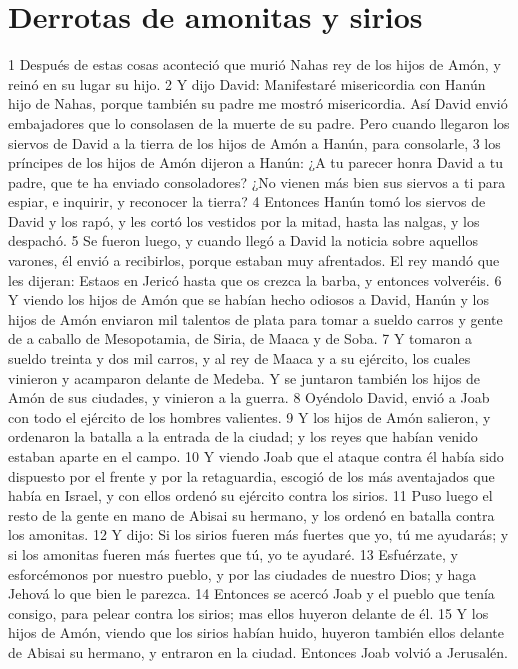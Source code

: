 \section*{Derrotas de amonitas y sirios}

1 Después de estas cosas aconteció que murió Nahas rey de los hijos de Amón, y reinó en su lugar su hijo.
2 Y dijo David: Manifestaré misericordia con Hanún hijo de Nahas, porque también su padre me mostró misericordia. Así David envió embajadores que lo consolasen de la muerte de su padre. Pero cuando llegaron los siervos de David a la tierra de los hijos de Amón a Hanún, para consolarle,
3 los príncipes de los hijos de Amón dijeron a Hanún: ¿A tu parecer honra David a tu padre, que te ha enviado consoladores? ¿No vienen más bien sus siervos a ti para espiar, e inquirir, y reconocer la tierra?
4 Entonces Hanún tomó los siervos de David y los rapó, y les cortó los vestidos por la mitad, hasta las nalgas, y los despachó.
5 Se fueron luego, y cuando llegó a David la noticia sobre aquellos varones, él envió a recibirlos, porque estaban muy afrentados. El rey mandó que les dijeran: Estaos en Jericó hasta que os crezca la barba, y entonces volveréis.
6 Y viendo los hijos de Amón que se habían hecho odiosos a David, Hanún y los hijos de Amón enviaron mil talentos de plata   para tomar a sueldo carros y gente de a caballo de Mesopotamia, de Siria, de Maaca y de Soba.
7 Y tomaron a sueldo treinta y dos mil carros, y al rey de Maaca y a su ejército, los cuales vinieron y acamparon delante de Medeba. Y se juntaron también los hijos de Amón de sus ciudades, y vinieron a la guerra.
8 Oyéndolo David, envió a Joab con todo el ejército de los hombres valientes.
9 Y los hijos de Amón salieron, y ordenaron la batalla a la entrada de la ciudad; y los reyes que habían venido estaban aparte en el campo.
10 Y viendo Joab que el ataque contra él había sido dispuesto por el frente y por la retaguardia, escogió de los más aventajados que había en Israel, y con ellos ordenó su ejército contra los sirios.
11 Puso luego el resto de la gente en mano de Abisai su hermano, y los ordenó en batalla contra los amonitas.
12 Y dijo: Si los sirios fueren más fuertes que yo, tú me ayudarás; y si los amonitas fueren más fuertes que tú, yo te ayudaré.
13 Esfuérzate, y esforcémonos por nuestro pueblo, y por las ciudades de nuestro Dios; y haga Jehová lo que bien le parezca.
14 Entonces se acercó Joab y el pueblo que tenía consigo, para pelear contra los sirios; mas ellos huyeron delante de él.
15 Y los hijos de Amón, viendo que los sirios habían huido, huyeron también ellos delante de Abisai su hermano, y entraron en la ciudad. Entonces Joab volvió a Jerusalén.
